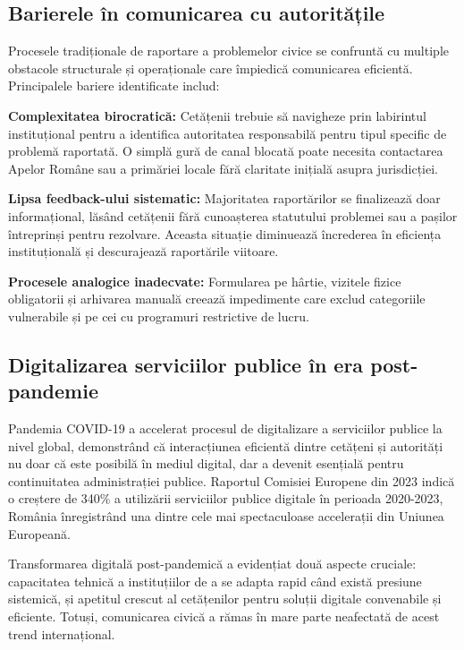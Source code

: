 \documentclass[12pt,a4paper]{report}
\begin{document}
\subsection{Barierele în comunicarea cu autoritățile}

Procesele tradiționale de raportare a problemelor civice se confruntă cu multiple obstacole structurale și operaționale care împiedică comunicarea eficientă. Principalele bariere identificate includ:

\textbf{Complexitatea birocratică:} Cetățenii trebuie să navigheze prin labirintul instituțional pentru a identifica autoritatea responsabilă pentru tipul specific de problemă raportată. O simplă gură de canal blocată poate necesita contactarea Apelor Române sau  a primăriei locale fără claritate inițială asupra jurisdicției.

\textbf{Lipsa feedback-ului sistematic:} Majoritatea raportărilor se finalizează doar   informațional, lăsând cetățenii fără cunoașterea statutului problemei sau a pașilor întreprinși pentru rezolvare. Aceasta situație diminuează încrederea în eficiența instituțională și descurajează raportările viitoare.

\textbf{Procesele analogice inadecvate:} Formularea pe hârtie, vizitele fizice obligatorii și arhivarea manuală creează impedimente care exclud categoriile vulnerabile și pe cei cu programuri restrictive de lucru.

\subsection{Digitalizarea serviciilor publice în era post-pandemie}

Pandemia COVID-19 a accelerat procesul de digitalizare a serviciilor publice la nivel global, demonstrând că interacțiunea eficientă dintre cetățeni și autorități nu doar că este posibilă în mediul digital, dar a devenit esențială pentru continuitatea administrației publice. Raportul Comisiei Europene din 2023 indică o creștere de 340\% a utilizării serviciilor publice digitale în perioada 2020-2023, România înregistrând una dintre cele mai spectaculoase accelerații din Uniunea Europeană.

Transformarea digitală post-pandemică a evidențiat două aspecte cruciale: capacitatea tehnică a instituțiilor de a se adapta rapid când există presiune sistemică, și apetitul crescut al cetățenilor pentru soluții digitale convenabile și eficiente. Totuși, comunicarea civică a rămas în mare parte neafectată de acest trend internațional.
\end{document}
